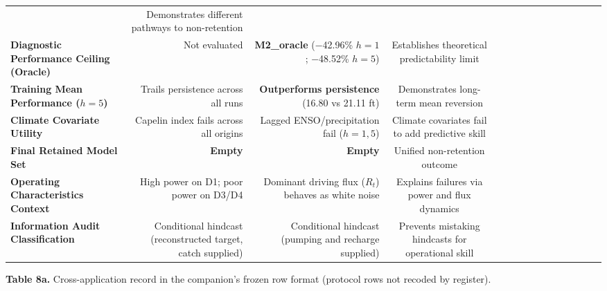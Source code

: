 \documentclass[11pt]{article}
\begin{document}
{\begin{longtable}[]
{and Class Grounds} & Demonstrates different pathways to non-retention \\
\textbf{Diagnostic Performance Ceiling (Oracle)} & Not evaluated &
\textbf{M2\_oracle} (−42.96\% \(h=1\); −48.52\% \(h=5\)) & Establishes
theoretical predictability limit \\
\textbf{Training Mean Performance (\(h = 5\))} & Trails persistence
across all runs & \textbf{Outperforms persistence} (16.80 vs 21.11 ft) &
Demonstrates long-term mean reversion \\
\textbf{Climate Covariate Utility} & Capelin index fails across all
origins & Lagged ENSO/precipitation fail (\(h=1, 5\)) & Climate
covariates fail to add predictive skill \\
\textbf{Final Retained Model Set} & \textbf{Empty} & \textbf{Empty} &
Unified non-retention outcome \\
\textbf{Operating Characteristics Context} & High power on D1; poor
power on D3/D4 & Dominant driving flux (\(R_t\)) behaves as white noise
& Explains failures via power and flux dynamics \\
\textbf{Information Audit Classification} & Conditional hindcast
(reconstructed target, catch supplied) & Conditional hindcast (pumping
and recharge supplied) & Prevents mistaking hindcasts for operational
skill \\
\end{longtable}
}

\textbf{Table 8a.} Cross-application record in the companion's frozen
row format (protocol rows not recoded by register).
\end{document}
